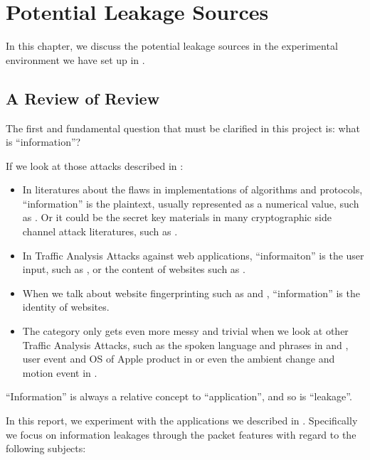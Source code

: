 \chapter{Potential Leakage Sources}

In this chapter, we discuss the potential leakage sources in the experimental environment we have set up in . 

\section{A Review of Review}

The first and fundamental question that must be clarified in this project is: what is ``information''?

If we look at those attacks described in :

\begin{itemize}
	\item In literatures about the flaws in implementations of algorithms and protocols, ``information'' is the plaintext, usually represented as a numerical value, such as \cite{802154sec} \cite{rfc7457} \cite{CompressionRatioAttack} \cite{PaddingOracle}. Or it could be the secret key materials in many cryptographic side channel attack literatures, such as \cite{DPA}.
	\item In Traffic Analysis Attacks against web applications, ``informaiton'' is the user input, such as \cite{PinpointWeb} \cite{SearchAttack}, or the content of websites such as \cite{WebSideChannel}.
	\item When we talk about website fingerprinting such as \cite{WebsiteFingerprint} \cite{Peekaboo} and \cite{PClassifier}, ``information'' is the identity of websites. 
	\item The category only gets even more messy and trivial when we look at other Traffic Analysis Attacks, such as the spoken language and phrases in \cite{VoIPLanguage} and \cite{VoIPPhrases}, user event and OS of Apple product in \cite{AppleMessage} or even the ambient change and motion event in \cite{Video}.
\end{itemize}

``Information'' is always a relative concept to ``application'', and so is ``leakage''. 

In this report, we experiment with the applications we described in . Specifically we focus on information leakages through the packet features with regard to the following subjects:

